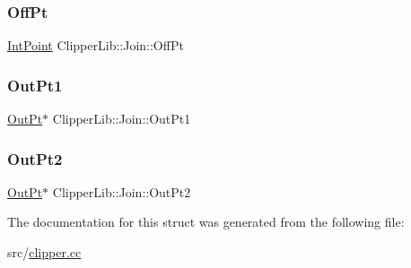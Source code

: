 \subsubsection{\texorpdfstring{OffPt}{OffPt}}
{\footnotesize\ttfamily \mbox{\hyperlink{struct_clipper_lib_1_1_int_point}{Int\+Point}} Clipper\+Lib\+::\+Join\+::\+Off\+Pt}

\mbox{\label{struct_clipper_lib_1_1_join_a83d7ff096b1cf9425f1c814b7ee5a55d}} 
\subsubsection{\texorpdfstring{OutPt1}{OutPt1}}
{\footnotesize\ttfamily \mbox{\hyperlink{struct_clipper_lib_1_1_out_pt}{Out\+Pt}}$\ast$ Clipper\+Lib\+::\+Join\+::\+Out\+Pt1}

\mbox{\label{struct_clipper_lib_1_1_join_a589b2e1162679def2ccd3889306a9230}} 
\subsubsection{\texorpdfstring{OutPt2}{OutPt2}}
{\footnotesize\ttfamily \mbox{\hyperlink{struct_clipper_lib_1_1_out_pt}{Out\+Pt}}$\ast$ Clipper\+Lib\+::\+Join\+::\+Out\+Pt2}



The documentation for this struct was generated from the following file\+:\begin{DoxyCompactItemize}
\item 
src/\mbox{\hyperlink{clipper_8cc}{clipper.\+cc}}\end{DoxyCompactItemize}
